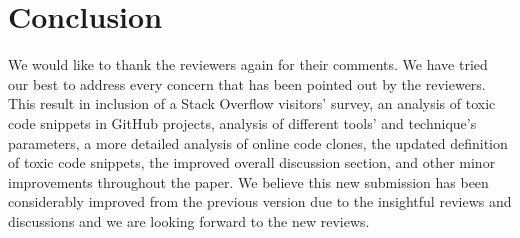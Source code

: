 \documentclass[a4paper,twoside,10pt]{reviewresponse}
\begin{document}
\vspace{1cm}

\section{Conclusion}
We would like to thank the reviewers again for their comments.
We have tried our best to address every concern that has been pointed out by the reviewers. This result in inclusion of a Stack Overflow visitors' survey, an analysis of toxic code snippets in GitHub projects, analysis of different tools' and technique's parameters, a more detailed analysis of online code clones, the updated definition of toxic code snippets, the improved overall discussion section, and other minor improvements throughout the paper.
We believe this new submission has been considerably improved from the previous version due to the insightful reviews and discussions and we are looking forward to the new reviews.

%


\end{document}
